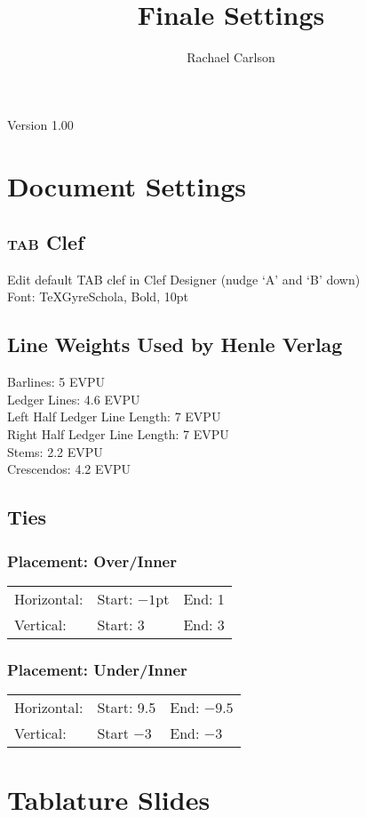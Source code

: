 \documentclass[10pt,twoside]{article} %
\title{\textsf{Finale Settings}}
\author{\textsf{Rachael Carlson}}
\begin{document}
\maketitle
\begin{center}
Version 1.00
\end{center}

\tableofcontents
\clearpage
\section{Document Settings}

\subsection{\textsc{tab} Clef}
Edit default TAB clef in Clef Designer (nudge `A' and 	`B' down)\\
Font: TeXGyreSchola, Bold, 10pt
\subsection{Line Weights Used by Henle Verlag}
Barlines: 5 EVPU\\
Ledger Lines: 4.6 EVPU\\
Left Half Ledger Line Length: 7 EVPU\\
Right Half Ledger Line Length: 7 EVPU\\
Stems: 2.2 EVPU\\
Crescendos: 4.2 EVPU
\subsection{Ties}
\subsubsection{Placement: Over/Inner}
\begin{tabular}{l l l}
Horizontal: & Start: $-1$pt & End: 1\\
Vertical: & Start: 3 & End: 3\\
\end{tabular}
\subsubsection{Placement: Under/Inner}
\begin{tabular}{l l l}
Horizontal: & Start: 9.5 & End: $-9.5$\\
Vertical: & Start $-3$ & End: $-3$
\end{tabular}
\section{Tablature Slides}
\end{document}
